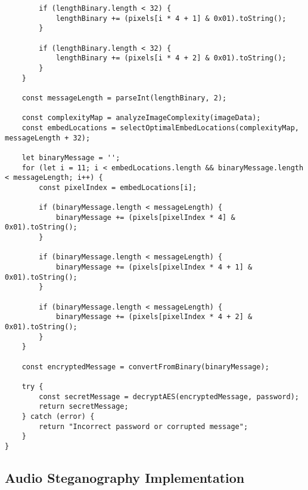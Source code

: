 \documentclass[12pt, a4paper, oneside]{book}
\begin{document}
\begin{verbatim}
        if (lengthBinary.length < 32) {
            lengthBinary += (pixels[i * 4 + 1] & 0x01).toString();
        }

        if (lengthBinary.length < 32) {
            lengthBinary += (pixels[i * 4 + 2] & 0x01).toString();
        }
    }

    const messageLength = parseInt(lengthBinary, 2);

    const complexityMap = analyzeImageComplexity(imageData);
    const embedLocations = selectOptimalEmbedLocations(complexityMap, messageLength + 32);

    let binaryMessage = '';
    for (let i = 11; i < embedLocations.length && binaryMessage.length < messageLength; i++) {
        const pixelIndex = embedLocations[i];

        if (binaryMessage.length < messageLength) {
            binaryMessage += (pixels[pixelIndex * 4] & 0x01).toString();
        }

        if (binaryMessage.length < messageLength) {
            binaryMessage += (pixels[pixelIndex * 4 + 1] & 0x01).toString();
        }

        if (binaryMessage.length < messageLength) {
            binaryMessage += (pixels[pixelIndex * 4 + 2] & 0x01).toString();
        }
    }

    const encryptedMessage = convertFromBinary(binaryMessage);

    try {
        const secretMessage = decryptAES(encryptedMessage, password);
        return secretMessage;
    } catch (error) {
        return "Incorrect password or corrupted message";
    }
}
\end{verbatim}

\subsection*{Audio Steganography Implementation}
\end{document}
